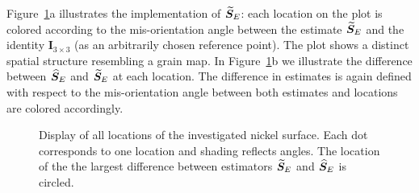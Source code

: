 Figure~\ref{fig:grain-map}a illustrates the implementation of ${\widetilde{\bm S}_E}$: each location on the plot is colored according to the mis-orientation angle between  the estimate ${\widetilde{\bm S}_E}$  and the identity $\bm I_{3\times 3}$ (as an arbitrarily chosen reference point).  The plot shows a distinct spatial structure resembling a grain map. In Figure~\ref{fig:grain-map}b we illustrate the difference between ${\widehat{\bm S}_E}$ and ${\widetilde{\bm S}_E}$ at each location. The difference in estimates is again defined with respect to the mis-orientation angle between both estimates and locations are colored accordingly. 
%
\begin{figure}[h!] %
   \centering
    \hfill
   \caption{ \label{fig:grain-map}  Display of all locations of the investigated nickel surface. Each dot corresponds to one location and shading reflects  angles. The location of the the largest difference between estimators ${\widetilde{\bm S}_E}$ and ${\widehat{\bm S}_E}$ is circled.}
\end{figure}
